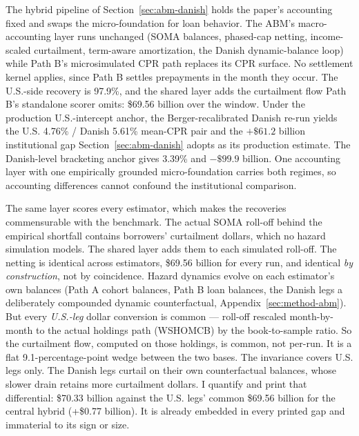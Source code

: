 \documentclass[12pt]{article}
\begin{document}
The hybrid pipeline of Section~\ref{sec:abm-danish} holds the paper's accounting fixed and swaps the micro-foundation for loan behavior. The ABM's macro-accounting layer runs unchanged (SOMA balances, phased-cap netting, income-scaled curtailment, term-aware amortization, the Danish dynamic-balance loop) while Path B's microsimulated CPR path replaces its CPR surface. No settlement kernel applies, since Path B settles prepayments in the month they occur. The U.S.-side recovery is 97.9\%, and the shared layer adds the curtailment flow Path B's standalone scorer omits: \$69.56 billion over the window. Under the production U.S.-intercept anchor, the Berger-recalibrated Danish re-run yields the U.S. 4.76\% / Danish 5.61\% mean-CPR pair and the $+\$61.2$ billion institutional gap Section~\ref{sec:abm-danish} adopts as its production estimate. The Danish-level bracketing anchor gives 3.39\% and $-\$99.9$ billion. One accounting layer with one empirically grounded micro-foundation carries both regimes, so accounting differences cannot confound the institutional comparison.

The same layer scores every estimator, which makes the recoveries commensurable with the benchmark. The actual SOMA roll-off behind the empirical shortfall contains borrowers' curtailment dollars, which no hazard simulation models. The shared layer adds them to each simulated roll-off. The netting is identical across estimators, \$69.56 billion for every run, and identical \emph{by construction}, not by coincidence. Hazard dynamics evolve on each estimator's own balances (Path A cohort balances, Path B loan balances, the Danish legs a deliberately compounded dynamic counterfactual, Appendix~\ref{sec:method-abm}). But every \emph{U.S.-leg} dollar conversion is common --- roll-off rescaled month-by-month to the actual holdings path (WSHOMCB) by the book-to-sample ratio. So the curtailment flow, computed on those holdings, is common, not per-run. It is a flat 9.1-percentage-point wedge between the two bases. The invariance covers U.S. legs only. The Danish legs curtail on their own counterfactual balances, whose slower drain retains more curtailment dollars. I quantify and print that differential: \$70.33 billion against the U.S. legs' common \$69.56 billion for the central hybrid (+\$0.77 billion). It is already embedded in every printed gap and immaterial to its sign or size.
\end{document}
